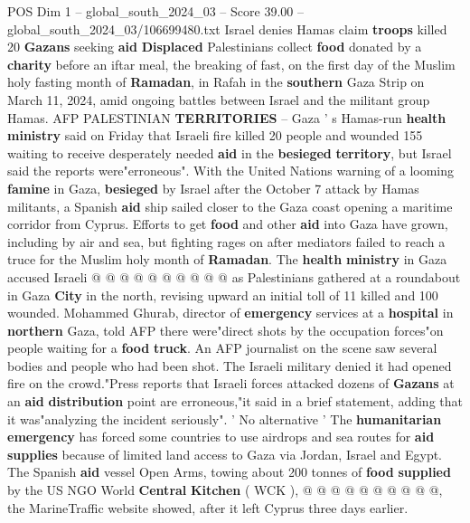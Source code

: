 \begin{textsample}{POS Dim 1 – global\_south\_2024\_03 – Score 39.00 – global\_south\_2024\_03/106699480.txt}  \label{ex:f1_pos_001}
Israel denies Hamas claim \textbf{troops} killed 20 \textbf{Gazans} seeking \textbf{aid} \textbf{Displaced} Palestinians collect \textbf{food} donated by a \textbf{charity} before an iftar meal, the breaking of fast, on the first day of the Muslim holy fasting month of \textbf{Ramadan}, in Rafah in the \textbf{southern} Gaza Strip on March 11, 2024, amid ongoing battles between Israel and the militant group Hamas.
AFP PALESTINIAN \textbf{TERRITORIES} -- Gaza ' s Hamas-run \textbf{health} \textbf{ministry} said on Friday that Israeli fire killed 20 people and wounded 155 waiting to receive desperately needed \textbf{aid} in the \textbf{besieged} \textbf{territory}, but Israel said the reports were"erroneous".
With the United Nations warning of a looming \textbf{famine} in Gaza, \textbf{besieged} by Israel after the October 7 attack by Hamas militants, a Spanish \textbf{aid} ship sailed closer to the Gaza coast opening a maritime corridor from Cyprus.
Efforts to get \textbf{food} and other \textbf{aid} into Gaza have grown, including by air and sea, but fighting rages on after mediators failed to reach a truce for the Muslim holy month of \textbf{Ramadan}.
The \textbf{health} \textbf{ministry} in Gaza accused Israeli @ @ @ @ @ @ @ @ @ @ as Palestinians gathered at a roundabout in Gaza \textbf{City} in the north, revising upward an initial toll of 11 killed and 100 wounded.
Mohammed Ghurab, director of \textbf{emergency} services at a \textbf{hospital} in \textbf{northern} Gaza, told AFP there were"direct shots by the occupation forces"on people waiting for a \textbf{food} \textbf{truck}.
An AFP journalist on the scene saw several bodies and people who had been shot.
The Israeli military denied it had opened fire on the crowd."Press reports that Israeli forces attacked dozens of \textbf{Gazans} at an \textbf{aid} \textbf{distribution} point are erroneous,"it said in a brief statement, adding that it was"analyzing the incident seriously". ' No alternative ' The \textbf{humanitarian} \textbf{emergency} has forced some countries to use airdrops and sea routes for \textbf{aid} \textbf{supplies} because of limited land access to Gaza via Jordan, Israel and Egypt.
The Spanish \textbf{aid} vessel Open Arms, towing about 200 tonnes of \textbf{food} \textbf{supplied} by the US NGO World \textbf{Central} \textbf{Kitchen} ( WCK ), @ @ @ @ @ @ @ @ @ @, the MarineTraffic website showed, after it left Cyprus three days earlier.

\end{textsample}
